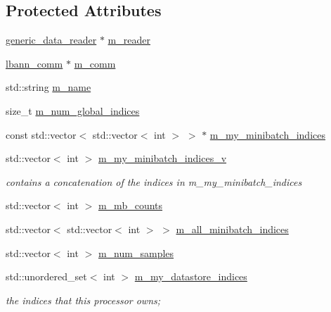 \subsection*{Protected Attributes}
\begin{DoxyCompactItemize}
\item 
\hyperlink{classlbann_1_1generic__data__reader}{generic\+\_\+data\+\_\+reader} $\ast$ \hyperlink{classlbann_1_1generic__data__store_afa49ced0ab64c632371ea52532a91ec2}{m\+\_\+reader}
\item 
\hyperlink{classlbann_1_1lbann__comm}{lbann\+\_\+comm} $\ast$ \hyperlink{classlbann_1_1generic__data__store_a719b6b99c20f97a6cf25f6029582bf36}{m\+\_\+comm}
\item 
std\+::string \hyperlink{classlbann_1_1generic__data__store_ad2c2e241eefc6ff972169d757f8d2499}{m\+\_\+name}
\item 
size\+\_\+t \hyperlink{classlbann_1_1generic__data__store_a0dfa2ffa01845b84ca477fb3e14a36c6}{m\+\_\+num\+\_\+global\+\_\+indices}
\item 
const std\+::vector$<$ std\+::vector$<$ int $>$ $>$ $\ast$ \hyperlink{classlbann_1_1generic__data__store_a54c0a85cd536ef566604c4e9916910c8}{m\+\_\+my\+\_\+minibatch\+\_\+indices}
\item 
std\+::vector$<$ int $>$ \hyperlink{classlbann_1_1generic__data__store_a41f7fec1f1f3d6568a5765be7a6784eb}{m\+\_\+my\+\_\+minibatch\+\_\+indices\+\_\+v}
\begin{DoxyCompactList}\small\item\em contains a concatenation of the indices in m\+\_\+my\+\_\+minibatch\+\_\+indices \end{DoxyCompactList}\item 
std\+::vector$<$ int $>$ \hyperlink{classlbann_1_1generic__data__store_a8ba0cf1a3d83d835060f45a53d77fbfd}{m\+\_\+mb\+\_\+counts}
\item 
std\+::vector$<$ std\+::vector$<$ int $>$ $>$ \hyperlink{classlbann_1_1generic__data__store_afd21d4f029e450328f8703dd72702e73}{m\+\_\+all\+\_\+minibatch\+\_\+indices}
\item 
std\+::vector$<$ int $>$ \hyperlink{classlbann_1_1generic__data__store_a17d6f931e1a2f4ae9e2452b7d47ead43}{m\+\_\+num\+\_\+samples}
\item 
std\+::unordered\+\_\+set$<$ int $>$ \hyperlink{classlbann_1_1generic__data__store_abd38f8d8aab0648959e09d011abfe20a}{m\+\_\+my\+\_\+datastore\+\_\+indices}
\begin{DoxyCompactList}\small\item\em the indices that this processor owns; \end{DoxyCompactList}\item 

\end{DoxyCompactItemize}

